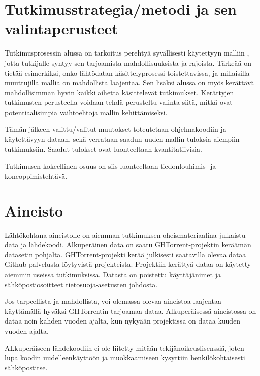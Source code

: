 \documentclass[utf8]{gradu3}
\begin{document}
\chapter{Tutkimusstrategia/metodi ja sen valintaperusteet}
Tutkimusprosessin alussa on tarkoitus perehtyä syvällisesti käytettyyn malliin
\parencite{riivo-2016}, jotta tutkijalle syntyy sen tarjoamista
mahdollisuuksista ja rajoista. Tärkeää on tietää esimerkiksi, onko lähtödatan
käsittelyprosessi toistettavissa, ja millaisilla muuttujilla mallia on
mahdollista laajentaa. Sen lisäksi alussa on myös kerättävä mahdollisimman hyvin
kaikki aihetta käsittelevät tutkimukset. Kerättyjen tutkimusten perusteella
voidaan tehdä perusteltu valinta siitä, mitkä ovat potentiaalisimpia
vaihtoehtoja mallin kehittämiseksi.

Tämän jälkeen valittu/valitut muutokset toteutetaan ohjelmakoodiin ja
käytettävyyn dataan, sekä verrataan saadun uuden mallin tuloksia aiempiin
tutkimuksiin. Saadut tulokset ovat luonteeltaan kvantitatiivisia. 

Tutkimusen kokeellinen osuus on siis luonteeltaan tiedonlouhimis- ja
koneoppimistehtävä.

\chapter{Aineisto}
Lähtökohtana aineistolle on aiemman tutkimuksen \parencite{riivo-2016}
oheismateriaalina julkaistu data ja lähdekoodi. Alkuperäinen data on saatu
GHTorrent-projektin \parencite{Gousi13} keräämän datasetin pohjalta.
GHTorrent-projekti kerää julkisesti saatavilla olevaa dataa Github-palvelusta
löytyvistä projekteista. Projektiin kerättyä dataa on käytetty aiemmin useissa
tutkimuksissa. Datasta on poistettu käyttäjänimet ja sähköpostiosoitteet
tietosuoja-asetusten johdosta.

Jos tarpeellista ja mahdollista, voi olemassa olevaa aineistoa laajentaa
käyttämällä hyväksi GHTorrentin tarjoamaa dataa. Alkuperäisessä aineistossa on
dataa noin kahden vuoden ajalta, kun nykyään projektissa on dataa kuuden vuoden
ajalta.

ALkuperäiseen lähdekoodiin ei ole liitetty mitään tekijänoikeuslisenssiä, joten
lupa koodin uudelleenkäyttöön ja muokkaamiseen kysyttiin henkilökohtaisesti
sähköpostitse.
\end{document}
